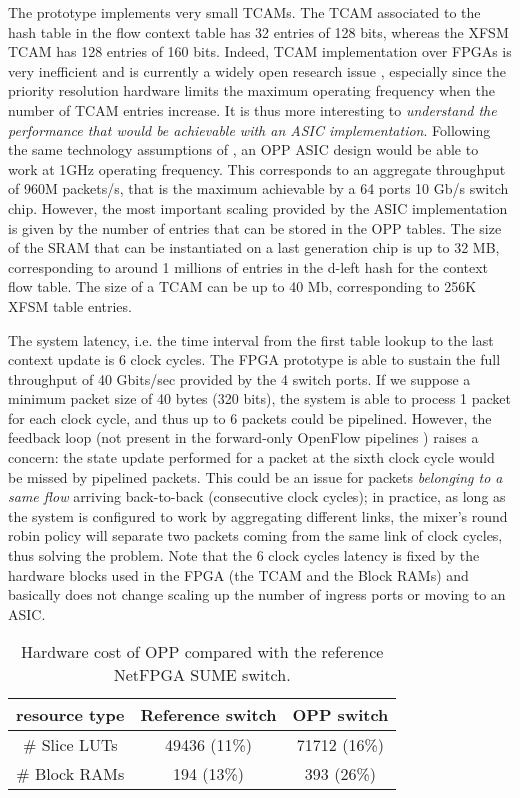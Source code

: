 \documentclass{sig-alternate}
\begin{document}
The prototype implements very small TCAMs. The TCAM associated to the hash table in the flow context table has 32 entries of 128 bits, whereas the XFSM TCAM has 128 entries of 160 bits. Indeed, TCAM implementation over FPGAs is very inefficient and is currently a widely open research issue \cite{TCAM1,TCAM2,TCAM4}, especially since the priority resolution hardware limits the maximum operating frequency when the number of TCAM entries increase. It is thus more interesting to {\em understand the performance that would be achievable with an ASIC implementation}. Following the same technology assumptions of \cite{Bos13}, an OPP ASIC design would be able to work at 1GHz operating frequency. This corresponds to an aggregate throughput of 960M packets/s, that is the maximum achievable by a 64 ports 10 Gb/s switch chip. However, the most important scaling provided by the ASIC implementation is given by the number of entries that can be stored in the OPP tables. The size of the SRAM that can be instantiated on a last generation chip is up to 32 MB, corresponding to around 1 millions of entries in the d-left hash for the context flow table. The size of a TCAM can be up to 40 Mb, corresponding to 256K XFSM table entries.

The system latency, i.e. the time interval from the first table lookup to the last context update is 6 clock cycles. The FPGA prototype is able to sustain the full throughput of 40 Gbits/sec provided by the 4 switch ports. If we suppose a minimum packet size of 40 bytes (320 bits), the system is able to process 1 packet for each clock cycle, and thus up to 6 packets could be pipelined. However, the feedback loop (not present in the forward-only OpenFlow pipelines \cite{OF1.4}) raises a concern: the state update performed for a packet at the sixth clock cycle would be missed by pipelined packets. This could be an issue for packets {\em belonging to a same flow} arriving back-to-back (consecutive clock cycles); in practice, as long as the system is configured to work by aggregating  different links, the mixer's round robin policy will separate two packets coming from the same link of  clock cycles, thus solving the problem. Note that the 6 clock cycles latency is fixed by the hardware blocks used in the FPGA (the TCAM and the Block RAMs) and basically does not change scaling up the number of ingress ports or moving to an ASIC.

\begin{table}[t]
\centering
\small 
\begin{tabular}{|c|c|c|}
  \hline
resource type & Reference switch & OPP switch   \\
\hline
\# Slice LUTs & 49436 (11\%) & 71712 (16\%)  \\
 \hline
\# Block RAMs & 194  (13\%)  & 393 (26\%) \\
  \hline
\end{tabular}
      	  \vspace{-0.6em}
\caption{Hardware cost of OPP compared with the reference NetFPGA SUME switch.}
      	  \vspace{-1.5em}
\label{t:synth}
\end{table}
\end{document}
